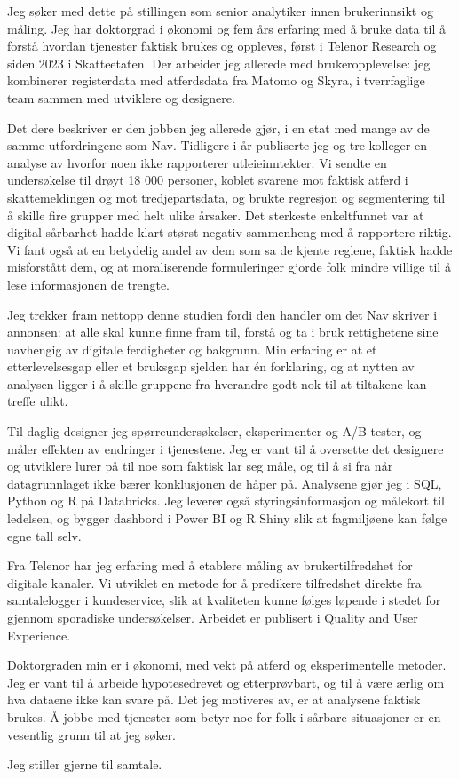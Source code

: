 \documentclass[10pt,a4paper,roman]{moderncv}
\date{20. august 2026}
\begin{document}
\makelettertitle

Jeg søker med dette på stillingen som senior analytiker innen brukerinnsikt og
måling. Jeg har doktorgrad i økonomi og fem års erfaring med å bruke data til å
forstå hvordan tjenester faktisk brukes og oppleves, først i Telenor Research og
siden 2023 i Skatteetaten. Der arbeider jeg allerede med brukeropplevelse: jeg
kombinerer registerdata med atferdsdata fra Matomo og Skyra, i tverrfaglige team
sammen med utviklere og designere.

Det dere beskriver er den jobben jeg allerede gjør, i en etat med mange av de
samme utfordringene som Nav. Tidligere i år publiserte jeg og tre kolleger en analyse
av hvorfor noen ikke rapporterer utleieinntekter. Vi sendte en undersøkelse til
drøyt 18 000 personer, koblet svarene mot faktisk atferd i skattemeldingen og
mot tredjepartsdata, og brukte regresjon og segmentering til å skille fire
grupper med helt ulike årsaker. Det sterkeste enkeltfunnet var at digital
sårbarhet hadde klart størst negativ sammenheng med å rapportere riktig. Vi fant
også at en betydelig andel av dem som sa de kjente reglene, faktisk hadde
misforstått dem, og at moraliserende formuleringer gjorde folk mindre villige
til å lese informasjonen de trengte.

Jeg trekker fram nettopp denne studien fordi den handler om det Nav skriver i
annonsen: at alle skal kunne finne fram til, forstå og ta i bruk rettighetene
sine uavhengig av digitale ferdigheter og bakgrunn. Min erfaring er at et
etterlevelsesgap eller et bruksgap sjelden har én forklaring, og at nytten av
analysen ligger i å skille gruppene fra hverandre godt nok til at tiltakene kan
treffe ulikt.

Til daglig designer jeg spørreundersøkelser, eksperimenter og A/B-tester, og
måler effekten av endringer i tjenestene. Jeg er vant til å oversette det
designere og utviklere lurer på til noe som faktisk lar seg måle, og til å si fra
når datagrunnlaget ikke bærer konklusjonen de håper på. Analysene gjør jeg i SQL,
Python og R på Databricks. Jeg leverer også
styringsinformasjon og målekort til ledelsen, og bygger dashbord i Power BI og R
Shiny slik at fagmiljøene kan følge egne tall selv.

Fra Telenor har jeg erfaring med å etablere måling av brukertilfredshet for
digitale kanaler. Vi utviklet en metode for å predikere tilfredshet direkte fra
samtalelogger i kundeservice, slik at kvaliteten kunne følges løpende i stedet
for gjennom sporadiske undersøkelser. Arbeidet er publisert i Quality and User
Experience.

Doktorgraden min er i økonomi, med vekt på atferd og eksperimentelle metoder. Jeg er vant til å arbeide
hypotesedrevet og etterprøvbart, og til å være ærlig om hva dataene ikke kan
svare på. Det jeg motiveres av, er at analysene faktisk brukes. Å jobbe med
tjenester som betyr noe for folk i sårbare situasjoner er en vesentlig grunn til
at jeg søker.

Jeg stiller gjerne til samtale.

\makeletterclosing
\end{document}
